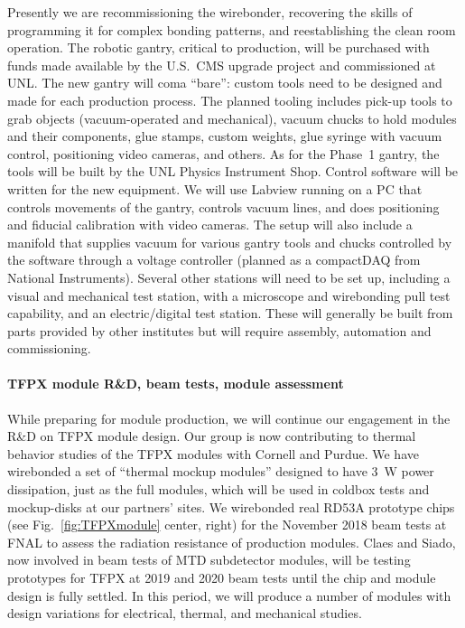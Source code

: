
Presently we are recommissioning the wirebonder, recovering the skills of programming it for complex bonding patterns, and  reestablishing the clean room operation.
The robotic gantry, critical to production, will be purchased with funds made available by the U.S.~CMS upgrade project and commissioned at UNL.  
The new gantry will coma ``bare'': custom tools need to be designed and made for each production process. The planned tooling includes pick-up tools to grab objects (vacuum-operated and mechanical), vacuum chucks to hold modules and their components, glue stamps, custom weights, glue syringe with vacuum control, positioning video cameras, and others. As for the Phase~1 gantry, the tools will be built by the UNL Physics Instrument Shop. Control software will be written for the new equipment. We will use Labview running on a PC that controls movements of the gantry, controls vacuum lines, and does positioning and fiducial calibration with video cameras. The setup will also include a manifold that supplies vacuum for various gantry tools and chucks controlled by the software through a voltage controller (planned as a compactDAQ from National Instruments). Several other stations will need to be set up, including a visual and mechanical test station, with a microscope and wirebonding pull test capability, and an electric/digital test station.  These will generally be built from parts provided by other institutes but will require assembly, automation and commissioning.

\paragraph{TFPX module R\&D, beam tests, module assessment}
While preparing for module production, we will continue our engagement in the R\&D on TFPX module design. Our group is now contributing to thermal behavior studies of the TFPX modules with Cornell and Purdue. We have wirebonded a set of ``thermal mockup modules'' designed to have 3~W power dissipation, just as the full modules, which will be used in coldbox tests and mockup-disks at our partners' sites. We wirebonded real RD53A prototype chips (see Fig.~\ref{fig:TFPXmodule} center, right) for the November 2018 beam tests at FNAL to assess the radiation resistance of production modules.  
Claes and Siado, now involved in beam tests of MTD subdetector modules, will be testing prototypes for TFPX at 2019 and 2020 beam tests until the chip and module design is fully settled. In this period, we will produce a number of modules with design variations for electrical, thermal, and mechanical studies.

